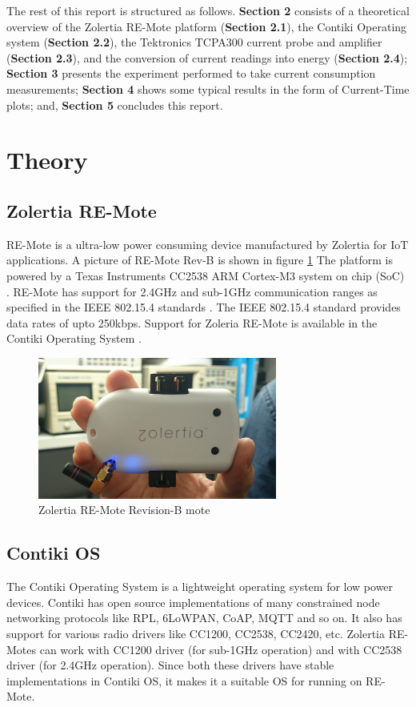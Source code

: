 \documentclass[a4paper]{article}
\begin{document}
The rest of this report is structured as follows. \textbf{Section 2} consists of a theoretical overview of the Zolertia RE-Mote platform (\textbf{Section 2.1}), the Contiki Operating system (\textbf{Section 2.2}), the Tektronics TCPA300 current probe and amplifier (\textbf{Section 2.3}), and the conversion of current readings into energy (\textbf{Section 2.4}); \textbf{Section 3} presents the experiment performed to take current consumption measurements; \textbf{Section 4} shows some typical results in the form of Current-Time plots; and, \textbf{Section 5} concludes this report.

\section{Theory}
\label{sec:theory}

\subsection{Zolertia RE-Mote}
RE-Mote is a ultra-low power consuming device manufactured by Zolertia for IoT applications. A picture of RE-Mote Rev-B is shown in figure \ref{fig:remote} The platform is powered by a Texas Instruments CC2538 ARM Cortex-M3 system on chip (SoC) \cite{remote}. RE-Mote has support for 2.4GHz and sub-1GHz communication ranges as specified in the IEEE 802.15.4 standards \cite{ieee802154}. The IEEE 802.15.4 standard provides data rates of upto 250kbps. Support for Zoleria RE-Mote is available in the Contiki Operating System \cite{contiki}.

\begin{figure}
\centering
\includegraphics[width=0.7\textwidth]{images/remote.pdf}
\caption{\label{fig:remote}Zolertia RE-Mote Revision-B mote}
\end{figure}

\subsection{Contiki OS}
The Contiki Operating System\cite{contiki} is a lightweight operating system for low power devices. Contiki has open source implementations of many constrained node networking protocols like RPL, 6LoWPAN, CoAP, MQTT and so on. It also has support for various radio drivers like CC1200, CC2538, CC2420, etc. Zolertia RE-Motes can work with CC1200 driver (for sub-1GHz operation) and with CC2538 driver (for 2.4GHz operation). Since both these drivers have stable implementations in Contiki OS, it makes it a suitable OS for running on RE-Mote.
\end{document}
